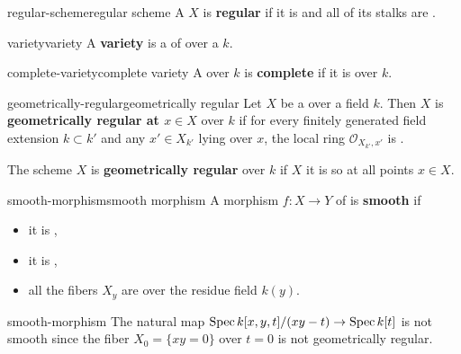 \begin{topic}{regular-scheme}{regular scheme}
    A  $X$ is \textbf{regular} if it is  and all of its stalks are .
\end{topic}

\begin{topic}{variety}{variety}
    A \textbf{variety} is a    of  over a  $k$.
\end{topic}

\begin{topic}{complete-variety}{complete variety}
    A  over $k$ is \textbf{complete} if it is  over $k$.
\end{topic}

\begin{topic}{geometrically-regular}{geometrically regular}
    Let $X$ be a   over a field $k$. Then $X$ is \textbf{geometrically regular at $x \in X$} over $k$ if for every finitely generated field extension $k \subset k'$ and any $x' \in X_{k'}$ lying over $x$, the local ring $\mathcal{O}_{X_{k'}, x'}$ is .
    
    The scheme $X$ is \textbf{geometrically regular} over $k$ if $X$ it is so at all points $x \in X$.
\end{topic}

\begin{topic}{smooth-morphism}{smooth morphism}
    A morphism $f : X \to Y$ of  is \textbf{smooth} if
    \begin{itemize}
        \item it is ,
        \item it is ,
        \item all the fibers $X_y$ are  over the residue field $k(y)$.
    \end{itemize}
\end{topic}

\begin{example}{smooth-morphism}
    The natural map $\operatorname{Spec} k[x, y, t] / (xy - t) \to \operatorname{Spec} k[t]$ is not smooth since the fiber $X_0 = \{ xy = 0 \}$ over $t = 0$ is not geometrically regular.
\end{example}

